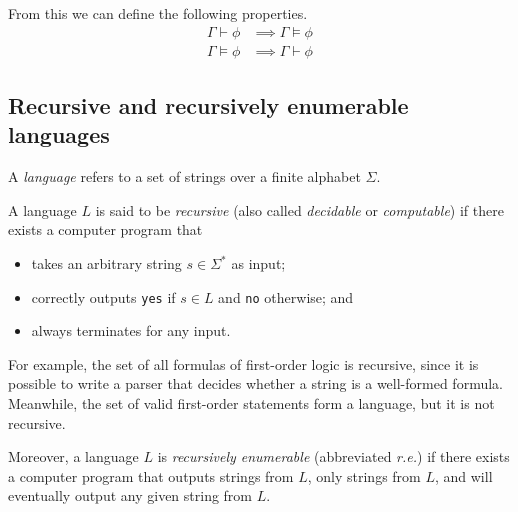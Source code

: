 From this we can define the following properties.
%
\begin{align*}
    \Gamma\vdash\phi&\implies\Gamma\models\phi \tag{Soundness}\\
    \Gamma\models\phi&\implies\Gamma\vdash\phi \tag{Strong completeness}
\end{align*}


\subsection{Recursive and recursively enumerable languages}

A \emph{language} refers to a set of strings over a finite alphabet \(\Sigma\).

A language \(L\) is said to be \emph{recursive} (also called \emph{decidable} or \emph{computable}) if there exists a computer program that
%
\begin{itemize}
    \item takes an arbitrary string \(s\in\Sigma^{*}\) as input;
    \item correctly outputs \texttt{yes} if \(s\in L\) and \texttt{no} otherwise; and
    \item always terminates for any input.
\end{itemize}

For example, the set of all formulas of first-order logic is recursive, since it is possible to write a parser that decides whether a string is a well-formed formula. Meanwhile, the set of valid first-order statements form a language, but it is not recursive.

Moreover, a language \(L\) is \emph{recursively enumerable} (abbreviated \emph{r.e.}) if there exists a computer program that outputs strings from \(L\), only strings from \(L\), and will eventually output any given string from \(L\).


